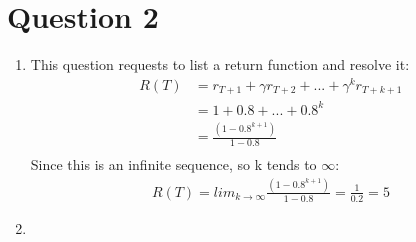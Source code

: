 \documentclass[12pt]{article}
\begin{document}
\section{Question 2}
\begin{enumerate}

\item This question requests to list a return function and resolve it:\\
\begin{align}
R(T) &= r_{T+1} + \gamma r_{T+2} + ... + \gamma^{k} r_{T+k+1}\\
&= 1 + 0.8 + ... + 0.8^{k}\\
&= \frac{(1-0.8^{k+1})}{1-0.8}\\
\end{align}
Since this is an infinite sequence, so k tends to $\infty$:\\
\begin{align}
R(T) = lim_{k \rightarrow \infty} \frac{(1-0.8^{k+1})}{1-0.8} = \frac{1}{0.2} = 5
\end{align}

\item
\begin{enumerate}


\end{enumerate}
\end{enumerate}
\end{document}
